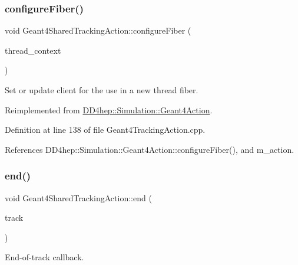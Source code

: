 \subsubsection{\texorpdfstring{configure\+Fiber()}{configureFiber()}}
{\footnotesize\ttfamily void Geant4\+Shared\+Tracking\+Action\+::configure\+Fiber (\begin{DoxyParamCaption}\item[{\hyperlink{class_d_d4hep_1_1_simulation_1_1_geant4_context}{Geant4\+Context} $\ast$}]{thread\+\_\+context }\end{DoxyParamCaption})\hspace{0.3cm}{\ttfamily [virtual]}}



Set or update client for the use in a new thread fiber. 



Reimplemented from \hyperlink{class_d_d4hep_1_1_simulation_1_1_geant4_action_a6adc7138508303e4e417cb48a737ab19}{D\+D4hep\+::\+Simulation\+::\+Geant4\+Action}.



Definition at line 138 of file Geant4\+Tracking\+Action.\+cpp.



References D\+D4hep\+::\+Simulation\+::\+Geant4\+Action\+::configure\+Fiber(), and m\+\_\+action.

\hypertarget{class_d_d4hep_1_1_simulation_1_1_geant4_shared_tracking_action_a35f435a97bbe15def248f21f37847a12}{}\label{class_d_d4hep_1_1_simulation_1_1_geant4_shared_tracking_action_a35f435a97bbe15def248f21f37847a12} 
\subsubsection{\texorpdfstring{end()}{end()}}
{\footnotesize\ttfamily void Geant4\+Shared\+Tracking\+Action\+::end (\begin{DoxyParamCaption}\item[{const G4\+Track $\ast$}]{track }\end{DoxyParamCaption})\hspace{0.3cm}{\ttfamily [virtual]}}



End-\/of-\/track callback. 



